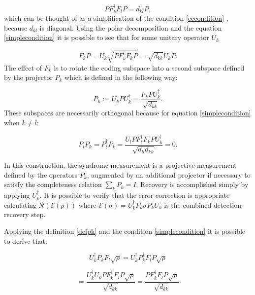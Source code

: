 \documentclass{article}
\begin{document}
\begin{equation}
	\label{simplecondition}
	P F_k^\dagger F_l P = d_{kl}P,
\end{equation}
which can be thought of as a simplification of the condition \ref{eccondition} ,
because $d_{kl}$ is diagonal.
Using the polar decomposition and the equation \ref{simplecondition} it is
possible to see that for some unitary operator $U_k$

\begin{equation}
	F_k P = U_k \sqrt{PF_k^\dagger F_k P} = \sqrt{d_{kk}} U_k P.
\end{equation}
The effect of $F_k$ is to rotate the coding subspace into a second subspace defined by
the projector $P_k$ which is defined in the following way:

\begin{equation}
	\label{defpk}
	P_k := U_k P U_k^\dagger = \dfrac{F_k P U_k^\dagger}{\sqrt{d_{kk}}}.
\end{equation}
These subspaces are necessarily orthogonal because for equation \ref{simplecondition}
when $k \neq l$:

\begin{equation}
	P_l P_k = P_l^\dagger P_k = \dfrac{U_l P F_l^\dagger F_k P U_k^\dagger}{\sqrt{d_{ll}d_{kk}}} = 0.
\end{equation}

\noindent In this construction, the syndrome measurement is a projective measurement defined by
the operators $P_k$, augmented by an additional projector if necessary to satisfy
the completeness relation $\sum_k P_k = I$.
Recovery is accomplished simply by applying $U_k^\dagger$.
It is possible to verify that the error correction is appropriate calculating
$ \mathcal{R}(\mathcal{E}(\rho)) $ where $\mathcal{E}(\sigma) = U_k^\dagger P_k \sigma P_k U_k$
is the combined detection-recovery step.

\noindent Applying the definition \ref{defpk} and the condition \ref{simplecondition}
it is possible to derive that:

\begin{equation}
	U_k^\dagger P_k F_l \sqrt{\rho} = U_k^\dagger P_k^\dagger F_l P \sqrt{\rho}
\end{equation}

\begin{equation}
	=	\dfrac{U_k^\dagger U_k P F_k^\dagger F_l P \sqrt{\rho}}{\sqrt{d_{kk}}} = \dfrac{P F_k^\dagger F_l P \sqrt{\rho}}{\sqrt{d_{kk}}}
\end{equation}
\end{document}
